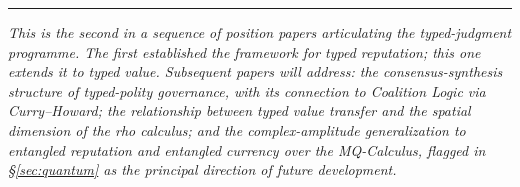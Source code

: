 \documentclass[11pt]{article}
\begin{document}
\bigskip

\hrule

\bigskip

\noindent\textit{This is the second in a sequence of position papers articulating the typed-judgment programme. The first established the framework for typed reputation; this one extends it to typed value. Subsequent papers will address: the consensus-synthesis structure of typed-polity governance, with its connection to Coalition Logic via Curry--Howard; the relationship between typed value transfer and the spatial dimension of the rho calculus; and the complex-amplitude generalization to entangled reputation and entangled currency over the MQ-Calculus, flagged in \S\ref{sec:quantum} as the principal direction of future development.}
\end{document}
